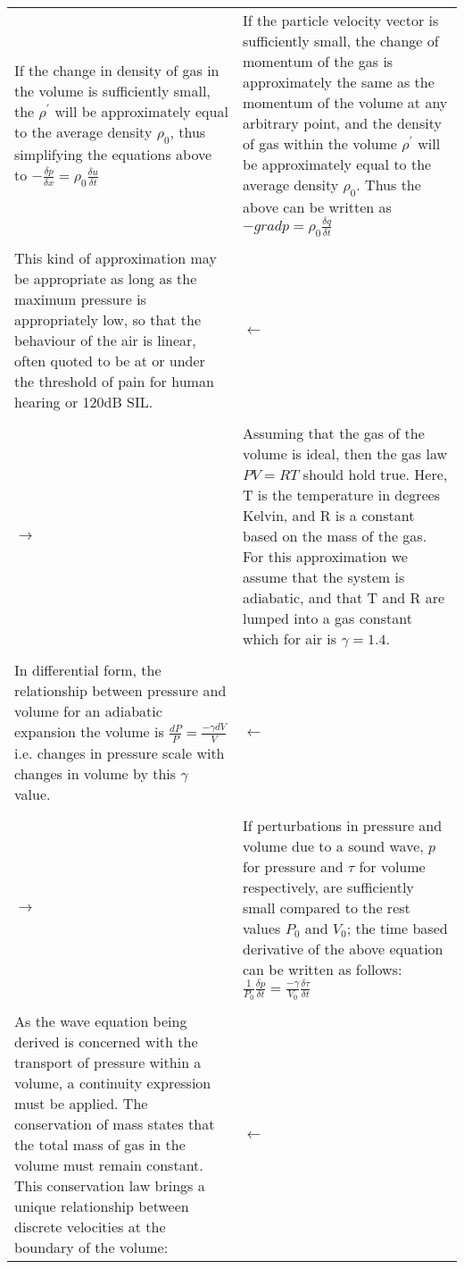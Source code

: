 \begin{center}
\begin{longtable}{|p{}|p{}|}
\\
If the change in density of gas in the volume is sufficiently small, the $\rho^{\prime}$ will be approximately equal to the average density $\rho_0$, thus simplifying the equations above to $-\frac{\delta p}{\delta x} = \rho_0 \frac{\delta u}{\delta t}$  & If the particle velocity vector is sufficiently small, the change of momentum of the gas is approximately the same as the momentum of the volume at any arbitrary point, and the density of gas within the volume $\rho^{\prime}$ will be approximately equal to the average density $\rho_0$. Thus the above can be written as $-grad p = \rho_0 \frac{\delta q}{\delta t}$ \\
\\
 This kind of approximation may be appropriate as long as the maximum pressure is appropriately low, so that the behaviour of the air is linear, often quoted to be at or under the threshold of pain for human hearing or 120dB SIL.  & $ \leftarrow$\\
\\
$ \rightarrow$ & Assuming that the gas of the volume is ideal, then the gas law $ PV = RT $ should hold true. Here, T is the temperature in degrees Kelvin, and R is a constant based on the mass of the gas. For this approximation we assume that the system is adiabatic, and that T and R are lumped into a gas constant which for air is $\gamma = 1.4$.  \\
\\
In differential form, the relationship between pressure and volume for an adiabatic expansion the volume is $\frac{dP}{P} = \frac{-\gamma dV}{V} $ i.e. changes in pressure scale with changes in volume by this $\gamma$ value. & $\leftarrow$ \\
\\
$\rightarrow$ & If perturbations in pressure and volume due to a sound wave, $p$ for pressure and $\tau$ for volume respectively, are sufficiently small compared to the rest values $P_0$ and $V_0$; the time based derivative of the above equation can be written as follows: $\frac{1}{P_0} \frac{\delta p}{\delta t} = \frac{-\gamma}{V_0} \frac{\delta \tau}{\delta t}$  \\
\\
As the wave equation being derived is concerned with the transport of pressure within a volume, a continuity expression must be applied. The conservation of mass states that the total mass of gas in the volume must remain constant. This conservation law brings a unique relationship between discrete velocities at the boundary of the volume: & $\leftarrow$\\

\end{longtable}
\end{center}
